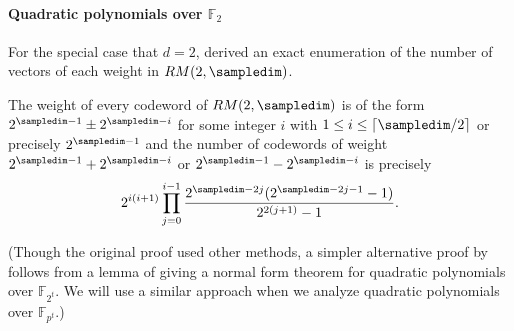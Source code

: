 
\paragraph{Quadratic polynomials over $\mathbb{F}_2$}
For the special case that $d=2$, \cite{DBLP:journals/tit/SloaneB70} derived an exact
enumeration of the number of vectors of each weight in $RM(2,\sampledim)$.

\begin{proposition}
\label{lem:RM(2,m)-count}
The weight of every codeword of $RM(2,\sampledim)$ is of the form $2^{\sampledim-1}\pm 2^{\sampledim-i}$
for some integer $i$ with $1\le i\le \lceil \sampledim/2\rceil$ or precisely $2^{\sampledim-1}$
and the number of codewords of weight $2^{\sampledim-1}+2^{\sampledim-i}$ or $2^{\sampledim-1}-2^{\sampledim-i}$ 
is precisely
$$2^{i(i+1)} \prod_{j=0}^{i-1} \frac{2^{\sampledim-2j}(2^{\sampledim-2j-1}-1)}{2^{2(j+1)}-1}.$$
\end{proposition}

(Though the original proof used other methods, a simpler alternative
proof by \cite{mceliece1967linear} follows from
a lemma of  \cite{dickson:book} giving a normal form theorem for quadratic polynomials over
$\mathbb{F}_{2^t}$.  
We will use a similar approach when we analyze
quadratic polynomials over $\mathbb{F}_{p^t}$.)


